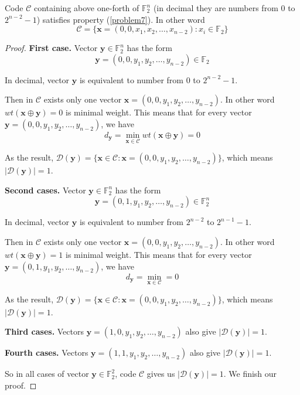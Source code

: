 \documentclass{article}
\newcommand{\FF}{\mathbb{F}}
\begin{document}
\begin{remark}
    Code $\mathcal{C}$ containing above one-forth of $\FF_2^n$ (in decimal they are numbers from 0 to $2^{n-2}-1$) satisfies property (\ref{problem7}). In other word \[ \mathcal{C} = \{ \bm{x} = (0, 0, x_1, x_2, \ldots, x_{n-2}): x_i \in \FF_2 \} \]
\end{remark}

\begin{proof}
    \textbf{First case.} Vector $\bm{y} \in \FF_2^n$ has the form \[ \bm{y} = (0, 0, y_1, y_2, \ldots, y_{n-2}) \in \FF_2 \]

    In decimal, vector $\bm{y}$ is equivalent to number from 0 to $2^{n-2}-1$.

    Then in $\mathcal{C}$ exists only one vector $\bm{x} = (0, 0, y_1, y_2, \ldots, y_{n-2})$. In other word $wt(\bm{x} \oplus \bm{y}) = 0$ is minimal weight. This means that for every vector $\bm{y} = (0, 0, y_1, y_2, \ldots, y_{n-2})$, we have \[ d_{\bm{y}} = \min_{\bm{x} \in \mathcal{C}} wt(\bm{x} \oplus \bm{y}) = 0 \]

    As the result, $\mathcal{D} (\bm{y}) = \{ \bm{x} \in \mathcal{C}: \bm{x} = (0, 0, y_1, y_2, \ldots, y_{n-2}) \}$, which means $\lvert \mathcal{D}(\bm{y}) \rvert= 1$.

    \textbf{Second cases.} Vector $\bm{y} \in \FF_2^n$ has the form \[ \bm{y} = (0, 1, y_1, y_2, \ldots, y_{n-2}) \in \FF_2^n \]

    In decimal, vector $\bm{y}$ is equivalent to number from $2^{n-2}$ to $2^{n-1}-1$.

    Then in $\mathcal{C}$ exists only one vector $\bm{x} = (0, 0, y_1, y_2, \ldots, y_{n-2})$. In other word $wt(\bm{x} \oplus \bm{y}) = 1$ is minimal weight. This means that for every vector $\bm{y} = (0, 1, y_1, y_2, \ldots, y_{n-2})$, we have \[ d_{\bm{y}} = \min_{\bm{x} \in \mathcal{C}} = 0 \]

    As the result, $\mathcal{D}(\bm{y}) = \{ \bm{x} \in \mathcal{C} : \bm{x} = (0, 0, y_1, y_2, \ldots, y_{n-2}) \}$, which means $\lvert \mathcal{D}(\bm{y}) \rvert = 1$.

    \textbf{Third cases.} Vectors $\bm{y} = (1, 0, y_1, y_2, \ldots, y_{n-2})$ also give $\lvert \mathcal{D}(\bm{y}) \rvert = 1$.

    \textbf{Fourth cases.} Vectors $\bm{y} = (1, 1, y_1, y_2, \ldots, y_{n-2})$ also give $\lvert \mathcal{D}(\bm{y}) \rvert = 1$.

    So in all cases of vector $\bm{y} \in \FF_2^2$, code $\mathcal{C}$ gives us $\lvert \mathcal{D}(\bm{y}) \rvert = 1$. We finish our proof.
\end{proof}
\end{document}
